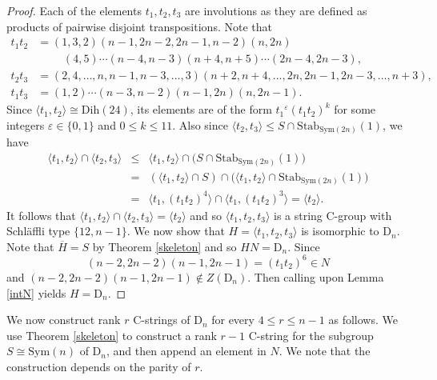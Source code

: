 \documentclass{amsart}
\numberwithin{equation}{section}
\theoremstyle{plain} %
\begin{document}
\begin{proof}
Each of the elements $t_1,t_2,t_3$ are involutions as they are defined as products of pairwise disjoint transpositions. Note that
\begin{align*}
t_1 t_2 &= (1,3,2)(n-1,2n-2,2n-1,n-2)(n,2n) \\ &\phantom{=}\quad (4,5)\cdots(n-4,n-3)(n+4,n+5)\cdots(2n-4,2n-3), \\
t_2 t_3 &= (2,4,\dots,n,n-1,n-3,\dots,3)(n+2,n+4,\dots,2n,2n-1,2n-3,\dots,n+3), \\
t_1 t_3 &= (1,2)\cdots(n-3,n-2)(n-1,2n)(n,2n-1).
\end{align*}
Since $\langle t_1,t_2 \rangle \cong \mathrm{Dih}(24)$, its elements are of the form ${t_1}^\varepsilon (t_1 t_2)^k$ for some integers $\varepsilon \in \{0,1\}$ and $0 \leq k \leq 11$. Also since $\langle t_2,t_3 \rangle \leq S \cap \mathrm{Stab}_{\mathrm{Sym}(2n)}(1)$, we have
\begin{eqnarray*}
\langle t_1,t_2 \rangle \cap \langle t_2,t_3 \rangle &\leq& \langle t_1,t_2 \rangle \cap \big(S \cap \mathrm{Stab}_{\mathrm{Sym}(2n)}(1)\big) \\
&=& (\langle t_1,t_2 \rangle \cap S) \cap \big(\langle t_1,t_2 \rangle \cap \mathrm{Stab}_{\mathrm{Sym}(2n)}(1) \big) \\
&=& \langle t_1,(t_1 t_2)^4 \rangle \cap \langle t_1,(t_1 t_2)^3 \rangle = \langle t_2 \rangle.
\end{eqnarray*}
It follows that $\langle t_1,t_2 \rangle \cap \langle t_2,t_3 \rangle = \langle t_2 \rangle$ and so $\langle t_1,t_2,t_3 \rangle$ is a string C-group with Schl\"{a}ffli type $\{12,n-1\}$. We now show that $H=\langle t_1,t_2,t_3 \rangle$ is isomorphic to $\mathrm{D}_n$. Note that $\overline{H}=S$ by Theorem \ref{skeleton} and so $HN=\mathrm{D}_n$. Since $$(n-2,2n-2)(n-1,2n-1)=(t_1 t_2)^6 \in N$$ and  $(n-2,2n-2)(n-1,2n-1) \notin Z(\mathrm{D}_n)$. Then calling upon Lemma \ref{intN} yields $H=\mathrm{D}_n$.
\end{proof}

We now construct rank $r$ C-strings of $\mathrm{D}_n$ for every $4 \leq r \leq n-1$ as follows. We use Theorem \ref{skeleton} to construct a rank $r-1$ C-string for the subgroup $S \cong \mathrm{Sym}(n)$ of $\mathrm{D}_n$, and then append an element in $N$. We note that the construction depends on the parity of $r$.
\end{document}
